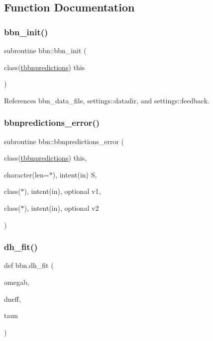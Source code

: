 \subsection{Function Documentation}
\mbox{\label{namespacebbn_a7da9f22f9be32950185f79ed74e69f4d}} 
\subsubsection{\texorpdfstring{bbn\+\_\+init()}{bbn\_init()}}
{\footnotesize\ttfamily subroutine bbn\+::bbn\+\_\+init (\begin{DoxyParamCaption}\item[{class(\mbox{\hyperlink{structbbn_1_1tbbnpredictions}{tbbnpredictions}})}]{this }\end{DoxyParamCaption})}



References bbn\+\_\+data\+\_\+file, settings\+::datadir, and settings\+::feedback.

\mbox{\label{namespacebbn_a89ea6267ce0d1cfa1ff459d517558a53}} 
\subsubsection{\texorpdfstring{bbnpredictions\+\_\+error()}{bbnpredictions\_error()}}
{\footnotesize\ttfamily subroutine bbn\+::bbnpredictions\+\_\+error (\begin{DoxyParamCaption}\item[{class(\mbox{\hyperlink{structbbn_1_1tbbnpredictions}{tbbnpredictions}})}]{this,  }\item[{character(len=$\ast$), intent(in)}]{S,  }\item[{class($\ast$), intent(in), optional}]{v1,  }\item[{class($\ast$), intent(in), optional}]{v2 }\end{DoxyParamCaption})}

\mbox{\label{namespacebbn_aeb738a501c7541234a13c16aeb6dbdf7}} 
\subsubsection{\texorpdfstring{dh\+\_\+fit()}{dh\_fit()}}
{\footnotesize\ttfamily def bbn.\+dh\+\_\+fit (\begin{DoxyParamCaption}\item[{}]{omegab,  }\item[{}]{dneff,  }\item[{}]{taun }\end{DoxyParamCaption})}

